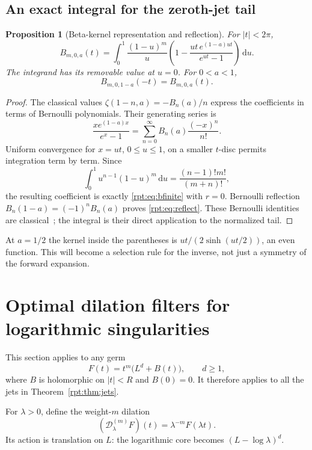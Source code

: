 \documentclass[11pt,a4paper]{article}
\numberwithin{equation}{section}
\newtheorem{proposition}[theorem]{Proposition}
\theoremstyle{definition}\newtheorem{definition}[theorem]{Definition}
\theoremstyle{remark}\newtheorem{remark}[theorem]{Remark}
\newcommand{\dd}{\,\mathrm d}
\begin{document}
\subsection{An exact integral for the zeroth-jet tail}

\begin{proposition}[Beta-kernel representation and reflection]
\label{rpt:prop:beta}
For $|t|<2\pi$,
\begin{equation}
B_{m,0,a}(t)=\int_0^1\frac{(1-u)^m}{u}
\left(1-\frac{ut\,e^{(1-a)ut}}{e^{ut}-1}\right)\dd u.
\label{rpt:eq:beta}
\end{equation}
The integrand has its removable value at $u=0$. For $0<a<1$,
\begin{equation}
B_{m,0,1-a}(-t)=B_{m,0,a}(t).
\label{rpt:eq:reflect}
\end{equation}
\end{proposition}
\begin{proof}
The classical values $\zeta(1-n,a)=-B_n(a)/n$ express the coefficients in terms of Bernoulli polynomials. Their generating series is
\[
\frac{x e^{(1-a)x}}{e^x-1}
=\sum_{n=0}^{\infty}B_n(a)\frac{(-x)^n}{n!}.
\]
Uniform convergence for $x=ut$, $0\le u\le1$, on a smaller $t$-disc permits integration term by term. Since
\[
\int_0^1 u^{n-1}(1-u)^m\dd u=\frac{(n-1)!m!}{(m+n)!},
\]
the resulting coefficient is exactly \eqref{rpt:eq:bfinite} with $r=0$. Bernoulli reflection $B_n(1-a)=(-1)^nB_n(a)$ proves \eqref{rpt:eq:reflect}. These Bernoulli identities are classical~\cite{dlmfhurwitz}; the integral is their direct application to the normalized tail.
\end{proof}

At $a=1/2$ the kernel inside the parentheses is $ut/(2\sinh(ut/2))$, an even function. This will become a selection rule for the inverse, not just a symmetry of the forward expansion.

\section{Optimal dilation filters for logarithmic singularities}
\label{rpt:sec:filters}

This section applies to any germ
\begin{equation}
F(t)=t^m\bigl(L^d+B(t)\bigr),\qquad d\ge1,
\label{rpt:eq:model}
\end{equation}
where $B$ is holomorphic on $|t|<R$ and $B(0)=0$. It therefore applies to all the jets in Theorem~\ref{rpt:thm:jets}.

For $\lambda>0$, define the weight-$m$ dilation
\[
(\mathcal D^{(m)}_\lambda F)(t)=\lambda^{-m}F(\lambda t).
\]
Its action is translation on $L$: the logarithmic core becomes $(L-\log\lambda)^d$.
\end{document}
